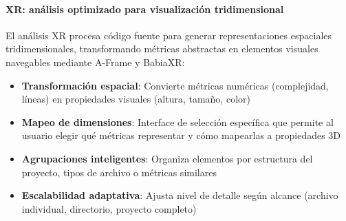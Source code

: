 \documentclass[a4paper, 12pt]{book}
\begin{document}
\paragraph{XR: análisis optimizado para visualización tridimensional}
El análisis XR procesa código fuente para generar representaciones espaciales tridimensionales, transformando métricas abstractas en elementos visuales navegables mediante A-Frame y BabiaXR:

\begin{itemize}
  \item \textbf{Transformación espacial}: Convierte métricas numéricas (complejidad, líneas) en propiedades visuales (altura, tamaño, color)
  \item \textbf{Mapeo de dimensiones}: Interface de selección específica que permite al usuario elegir qué métricas representar y cómo mapearlas a propiedades 3D
  \item \textbf{Agrupaciones inteligentes}: Organiza elementos por estructura del proyecto, tipos de archivo o métricas similares
  \item \textbf{Escalabilidad adaptativa}: Ajusta nivel de detalle según alcance (archivo individual, directorio, proyecto completo)
\end{itemize}
\end{document}
